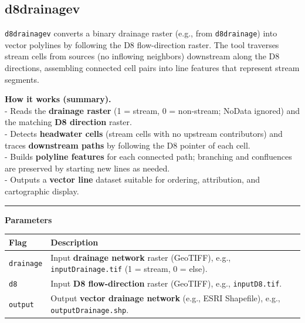 \documentclass[
]{book}
\theoremstyle{definition}
\theoremstyle{definition}
\theoremstyle{definition}
\theoremstyle{definition}
\theoremstyle{remark}
\begin{document}
\subsection{d8drainagev}\label{d8drainagev}

\texttt{d8drainagev} converts a binary drainage raster (e.g., from \texttt{d8drainage}) into vector polylines by following the D8 flow-direction raster. The tool traverses stream cells from sources (no inflowing neighbors) downstream along the D8 directions, assembling connected cell pairs into line features that represent stream segments.

\textbf{How it works (summary).}\\
- Reads the \textbf{drainage raster} (1 = stream, 0 = non-stream; NoData ignored) and the matching \textbf{D8 direction} raster.\\
- Detects \textbf{headwater cells} (stream cells with no upstream contributors) and traces \textbf{downstream paths} by following the D8 pointer of each cell.\\
- Builds \textbf{polyline features} for each connected path; branching and confluences are preserved by starting new lines as needed.\\
- Outputs a \textbf{vector line} dataset suitable for ordering, attribution, and cartographic display.

\begin{center}\rule{0.5\linewidth}{0.5pt}\end{center}

\textbf{Parameters}

\begin{longtable}[]{@{}
  >{\raggedright\arraybackslash}p{}
  >{\raggedright\arraybackslash}p{}@{}}
\toprule\noalign{}
\begin{minipage}[b]{\linewidth}\raggedright
Flag
\end{minipage} & \begin{minipage}[b]{\linewidth}\raggedright
Description
\end{minipage} \\
\midrule\noalign{}
\endhead
\bottomrule\noalign{}
\endlastfoot
\texttt{drainage} & Input \textbf{drainage network} raster (GeoTIFF), e.g., \texttt{inputDrainage.tif} (1 = stream, 0 = else). \\
\texttt{d8} & Input \textbf{D8 flow-direction} raster (GeoTIFF), e.g., \texttt{inputD8.tif}. \\
\texttt{output} & Output \textbf{vector drainage network} (e.g., ESRI Shapefile), e.g., \texttt{outputDrainage.shp}. \\
\end{longtable}
\end{document}

